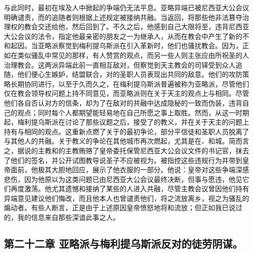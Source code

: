 与此同时，最初在埃及人中掀起的争端仍无法平息。亚略异端已被尼西亚大公会议明确谴责，而的追随者则根据上述规定被接纳共融。当返回，将那些他非法篡夺治理权的教会交还给他，然后回到了。不久之后，他感到自己大限将至，违背尼西亚大公会议的法令，指定他最亲密的朋友之一为继承人，从而在教会中产生了新的不和起因。当亚略派察觉到梅利提乌斯派在引入革新时，他们也骚扰教会。因为，正如在类似骚乱中常见的那样，有人赞赏的观点，而另一些人则主张应由所祝圣的人治理教会。这两派异端此前一直相互敌对，但察觉到天主教会的司铎受到众人追随，他们便心生嫉妒，结盟联合，对的圣职人员表现出共同的敌意。他们的攻防策略长期协同进行，以至于久而久之，在梅利提乌斯派普遍被称为亚略派，尽管他们仅在教会领导权问题上持不同意见，而亚略派则在关于天主的观点上与相同。尽管他们各自否认对方的信条，却为了在敌对的共融中达成隐秘的一致而伪装，违背自己的观点；同时每个人都期望能轻易地在自己所愿之事上取胜。然而，从这一时期起，梅利提乌斯派在讨论了那些议题之后，接受了的教义，并在关于天主的问题上持有与相同的观点。这重新点燃了关于的最初争论，部分平信徒和圣职人员脱离了与其他人的共融。关于教义的争论在其他城市再次燃起，尤其是在、和城。简而言之，据说的主教和的主教贿赂了皇帝委托保管尼西亚大公会议文件的书记官，抹去了他们的签名，并公开试图教导说圣子不应被视为。被指控这些违规行为并带到皇帝面前，他极其大胆地回应，展示了他衣服的一部分。他说：皇帝对这些争端深感悲伤，因为他原以为这类问题已由尼西亚大公会议最终决断，但事与愿违，他见它们再度激荡。他尤其遗憾和接纳了某些的人进入共融，尽管主教会议曾因他们持有异端意见建议他们悔改，而且他本人也曾谴责他们，将之流放离乡，视之为骚乱的煽动者。有些人断言，正是由于上述原因皇帝愤怒地将和流放；但正如我已说过的，我的信息来自那些深谙此事之人。\par


\subsection{第二十二章 亚略派与梅利提乌斯派反对的徒劳阴谋。}


